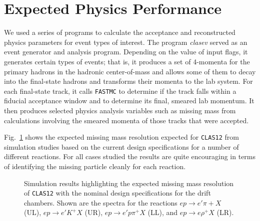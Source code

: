 \section{Expected Physics Performance}

We used a series of programs to calculate the acceptance and reconstructed 
physics parameters for event types of interest.  The program {\it clasev}
\cite{clasev} served as an event generator and analysis program. 
Depending on the value of input flags, it generates certain types of 
events; that is, it produces a set of 4-momenta for the primary hadrons 
in the hadronic center-of-mass and allows some of them to decay into the 
final-state hadrons and transforms their momenta to the lab system.  For 
each final-state track, it calls {\tt FASTMC} to determine if the track 
falls within a fiducial acceptance window and to determine its final, 
smeared lab momentum.  It then produces selected physics analysis variables 
such as missing mass from calculations involving the smeared momenta of 
those tracks that were accepted. 

Fig.~\ref{massplot} shows the expected missing mass resolution 
expected for {\tt CLAS12} from simulation studies based on the current
design specifications for a number of different reactions.  For all
cases studied the results are quite encouraging in terms of identifying
the missing particle cleanly for each reaction.

\begin{figure}[htbp]
\vspace{14.0cm}
\caption{\small{Simulation results highlighting the expected missing
mass resolution of {\tt CLAS12} with the nominal design specifications for
the drift chambers.  Shown are the spectra for the reactions
$ep \to e'\pi+X$ (UL), $ep \to e'K^+X$ (UR), $ep \to e'p\pi^+X$ (LL),
and $ep \to e\rho^+X$ (LR).}}
\label{massplot}
\end{figure}
